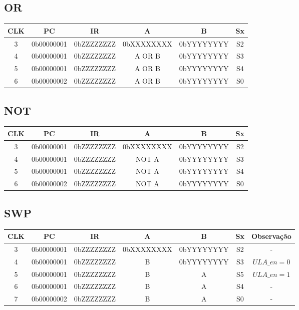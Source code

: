 \documentclass[../main.tex]{subfiles}
\begin{document}
\subsection{OR}

\begin{table}[H]
	\centering
	\begin{tabular}{|c|c|c|c|c|c|} %
	\hline
	CLK & PC & IR & A& B & Sx \\\hline
	3 & 0b00000001 & 0bZZZZZZZZ & 0bXXXXXXXX & 0bYYYYYYYY & S2 \\\hline 
	4 & 0b00000001 & 0bZZZZZZZZ & A OR B & 0bYYYYYYYY & S3 \\\hline
	5 & 0b00000001 & 0bZZZZZZZZ & A OR B & 0bYYYYYYYY & S4 \\\hline
	6 & 0b00000002 & 0bZZZZZZZZ & A OR B & 0bYYYYYYYY & S0 \\\hline	
	\end{tabular}
\end{table}

\subsection{NOT}

\begin{table}[H]
	\centering
	\begin{tabular}{|c|c|c|c|c|c|} %
	\hline
	CLK & PC & IR & A& B & Sx \\\hline
	3 & 0b00000001 & 0bZZZZZZZZ & 0bXXXXXXXX & 0bYYYYYYYY & S2 \\\hline 
	4 & 0b00000001 & 0bZZZZZZZZ & NOT A & 0bYYYYYYYY & S3 \\\hline
	5 & 0b00000001 & 0bZZZZZZZZ & NOT A & 0bYYYYYYYY & S4 \\\hline
	6 & 0b00000002 & 0bZZZZZZZZ & NOT A & 0bYYYYYYYY & S0 \\\hline	
	\end{tabular}
\end{table}

\subsection{SWP}

\begin{table}[H]
	\centering
	\begin{tabular}{|c|c|c|c|c|c|c|} %
	\hline
	CLK & PC & IR & A& B & Sx & Observação\\\hline
	3 & 0b00000001 & 0bZZZZZZZZ & 0bXXXXXXXX & 0bYYYYYYYY & S2 & - \\\hline 
	4 & 0b00000001 & 0bZZZZZZZZ & B & 0bYYYYYYYY & S3 & $ULA\_en=0$\\\hline
	5 & 0b00000001 & 0bZZZZZZZZ & B & A & S5 & $ULA\_en=1$\\\hline
	6 & 0b00000001 & 0bZZZZZZZZ & B & A & S4 & - \\\hline
	7 & 0b00000002 & 0bZZZZZZZZ & B & A & S0 & - \\\hline	
	\end{tabular}
\end{table}
\end{document}
